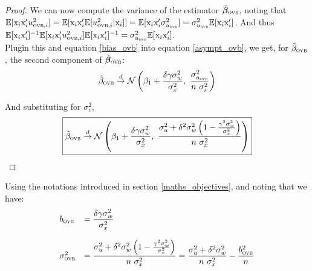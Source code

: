 \documentclass[a4paper, 11pt]{report}
\begin{document}
\begin{proof}
				We can now compute the variance of the estimator $\hat{\bm{\beta}}_{\textsc{ovb}}$, noting that $\mathbb{E}[\text{x}_{i}\text{x}_{i}'u_{\textsc{ovb}, i}^{2}] = \mathbb{E}[\text{x}_{i}\text{x}_{i}'\mathbb{E}[u_{\textsc{ovb}, i}^{2} | \text{x}_{i}]] =  \mathbb{E}[\text{x}_{i}\text{x}_{i}' \sigma_{u_{\textsc{ovb}}}^{2}] = \sigma_{u_{\textsc{ovb}}}^{2} \mathbb{E}[\text{x}_{i}\text{x}_{i}']$. And thus $\mathbb{E}[\text{x}_{i}\text{x}_{i}']^{-1} \mathbb{E}[\text{x}_{i}\text{x}_{i}'u_{\textsc{ovb}, i}^{2}] \mathbb{E}[\text{x}_{i}\text{x}_{i}']^{-1} = \sigma_{u_{\textsc{ovb}}}^{2} \mathbb{E}[\text{x}_{i}\text{x}_{i}']$.\\
				
				Plugin this and equation \ref{bias_ovb} into equation \ref{asympt_ovb}, we get, for $\hat{\beta}_{\textsc{ovb}}$, the second component of $\hat{\bm{\beta}}_{\textsc{ovb}}$:
				\begin{equation*}
						\hat{\beta}_{\textsc{ovb}} \overset{d}{\to} \mathcal{N}\left( \beta_1 + \dfrac{\delta \gamma \sigma_{w}^{2}}{\sigma_{x}^{2}}, \ \dfrac{\sigma_{u_{\textsc{ovb}}}^{2}}{n \ \sigma_{x}^{2}} \right) 
				\end{equation*}
				
				And substituting for $\sigma_{v}^{2}$,
				\begin{equation*}
					\boxed{
						\hat{\beta}_{\textsc{ovb}} \overset{d}{\to} \mathcal{N}\left( \beta_1 + \dfrac{\delta \gamma \sigma_{w}^{2}}{\sigma_{x}^{2}}, \ \dfrac{ \sigma_{u}^{2} +  \delta^{2} \sigma_{w}^{2} \left(1 - \frac{\gamma^{2}\sigma_{w}^{2}}{\sigma_{x}^{2}} \right)}{n \ \sigma_{x}^{2}} \right) 
					}
				\end{equation*}
			\end{proof}
				
				Using the notations introduced in section \ref{maths_objectives}, and noting that  we have:
				~
				\begin{equation}\label{b_sigma_ovb}
					\begin{array}{lll}
						b_{\textsc{ovb}} & = \dfrac{\delta \gamma \sigma_{w}^{2}}{\sigma_{x}^{2}} \\~\\
						\sigma_{\textsc{ovb}}^{2} & = \dfrac{ \sigma_{u}^{2} +  \delta^{2} \sigma_{w}^{2} \left(1 - \frac{\gamma^{2}\sigma_{w}^{2}}{\sigma_{x}^{2}} \right)}{n \ \sigma_{x}^{2}} =  \dfrac{ \sigma_{u}^{2} +  \delta^{2} \sigma_{w}^{2}}{n \ \sigma_{x}^{2}}  - \dfrac{b_{\textsc{ovb}}^{2}}{n}
					\end{array}				
				\end{equation}
				
\end{document}
